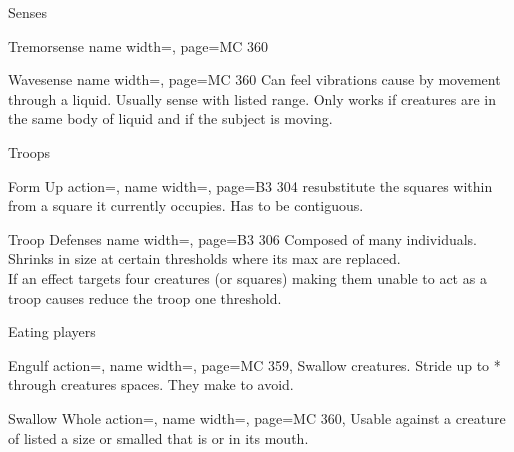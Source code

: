 \begin{PageFront}
\begin{Table}{Senses}
\begin{entry}{Tremorsense}{%
            name width=\monsterLength,
            page=MC 360%
        }
        \end{entry}
        \begin{entry}{Wavesense}{%
            name width=\monsterLength,
            page=MC 360%
        }
            Can feel vibrations cause by movement through a liquid. Usually  sense with listed range. \hfill Only works if creatures are in the same body of liquid and if the subject is moving.
        \end{entry}
    \end{Table}
    \begin{Table}{Troops}
        \begin{entry}{Form Up}{%
            action=,
            name width=\monsterLength,
            page={B3 304}
        }
            resubstitute the squares within  \Feet from a square it currently occupies. Has to be contiguous.
        \end{entry}
        \begin{entry}{Troop Defenses}{%
            name width=\monsterLength,
            page={B3 306}%
        }
            Composed of many individuals. Shrinks in size at certain thresholds where its max \HPs are replaced.\hfill
            \\
            If an effect targets four creatures (or squares) making them unable to act as a troop causes reduce the troop one threshold.\hfill {}
        \end{entry}
    \end{Table}
    \begin{Table}{Eating players}
        \begin{entry}{Engulf}{%
            action=,
            name width=\monsterLength,%
            page=MC 359,%
        }
            Swallow creatures. Stride up to * through creatures spaces. They make \Reflex[][before={}][] to avoid. \hfill {}\\
            \quad{}\hfill {}
        \end{entry}
        \begin{entry}{Swallow Whole}{%
            action=,
            name width=\monsterLength,
            page=MC 360,%
        }
            Usable against a creature of listed a size or smalled that is \Grabbed or \Restrained in its mouth.\\

\end{entry}
\end{Table}
\end{PageFront}

